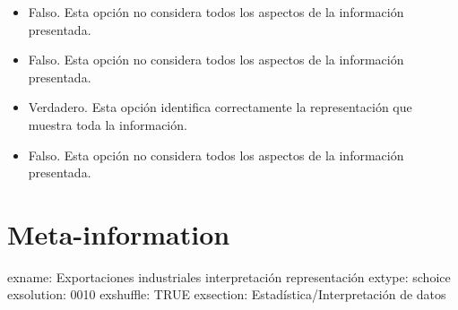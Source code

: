 \documentclass[
]{article}
\providecommand{\tightlist}{%
  \setlength{\itemsep}{0pt}\setlength{\parskip}{0pt}}
\begin{document}
\begin{itemize}
\tightlist
\item
  Falso. Esta opción no considera todos los aspectos de la información
  presentada.
\item
  Falso. Esta opción no considera todos los aspectos de la información
  presentada.
\item
  Verdadero. Esta opción identifica correctamente la representación que
  muestra toda la información.
\item
  Falso. Esta opción no considera todos los aspectos de la información
  presentada.
\end{itemize}

\section{Meta-information}\label{meta-information}

exname: Exportaciones industriales interpretación representación extype:
schoice exsolution: 0010 exshuffle: TRUE exsection:
Estadística/Interpretación de datos
\end{document}
